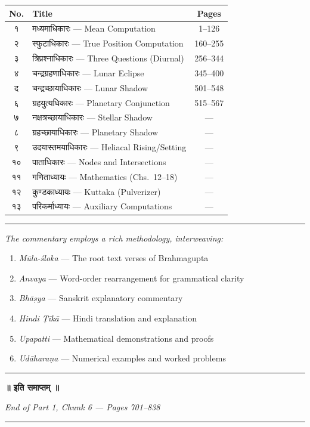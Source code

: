 \documentclass[11pt,a4paper]{article}
\newcommand{\longline}{\noindent\rule{\textwidth}{0.4pt}}
\newcommand{\dev}[1]{{\devanagarifont #1}}
\newcommand{\divider}{\begin{center}\rule{0.6\textwidth}{0.5pt}\end{center}}
\newcommand{\ditem}[1]{{\devanagarifont #1}}
\newcommand{\dhead}[1]{{\devanagarifont\textbf{#1}}}
\begin{document}
\begin{center}
\begin{tabular}{@{}clc@{}}
\toprule
\dhead{No.} & \dhead{Title} & \textbf{Pages} \\
\midrule
\ditem{१} & \ditem{मध्यमाधिकारः} --- Mean Computation & 1--126 \\
\ditem{२} & \ditem{स्फुटाधिकारः} --- True Position Computation & 160--255 \\
\ditem{३} & \ditem{त्रिप्रश्नाधिकारः} --- Three Questions (Diurnal) & 256--344 \\
\ditem{४} & \ditem{चन्द्रग्रहणाधिकारः} --- Lunar Eclipse & 345--400 \\
\ditem{द} & \ditem{चन्द्रच्छायाधिकारः} --- Lunar Shadow & 501--548 \\
\ditem{६} & \ditem{ग्रहयुत्यधिकारः} --- Planetary Conjunction & 515--567 \\
\ditem{७} & \ditem{नक्षत्रच्छायाधिकारः} --- Stellar Shadow & --- \\
\ditem{८} & \ditem{ग्रहच्छायाधिकारः} --- Planetary Shadow & --- \\
\ditem{९} & \ditem{उदयास्तमयाधिकारः} --- Heliacal Rising/Setting & --- \\
\ditem{१०} & \ditem{पाताधिकारः} --- Nodes and Intersections & --- \\
\ditem{११} & \ditem{गणिताध्यायः} --- Mathematics (Chs.\ 12--18) & --- \\
\ditem{१२} & \ditem{कुण्डकाध्यायः} --- Kuttaka (Pulverizer) & --- \\
\ditem{१३} & \ditem{परिकर्माध्यायः} --- Auxiliary Computations & --- \\
\bottomrule
\end{tabular}
\end{center}

\divider

\vspace{0.5cm}
\begin{center}
\textit{The commentary employs a rich methodology, interweaving:}
\begin{enumerate}[label=(\roman*),leftmargin=2em]
  \item \textit{Mūla-śloka} --- The root text verses of Brahmagupta
  \item \textit{Anvaya} --- Word-order rearrangement for grammatical clarity
  \item \textit{Bhāṣya} --- Sanskrit explanatory commentary
  \item \textit{Hindi Ṭīkā} --- Hindi translation and explanation
  \item \textit{Upapatti} --- Mathematical demonstrations and proofs
  \item \textit{Udāharaṇa} --- Numerical examples and worked problems
\end{enumerate}
\end{center}

\vspace{1cm}
\begin{center}
\longline

\textbf{\Large\dev{॥ इति समाप्तम् ॥}}

\vspace{0.5cm}
\textit{End of Part 1, Chunk 6 --- Pages 701--838}

\vspace{0.3cm}
\longline
\end{center}
\end{document}
